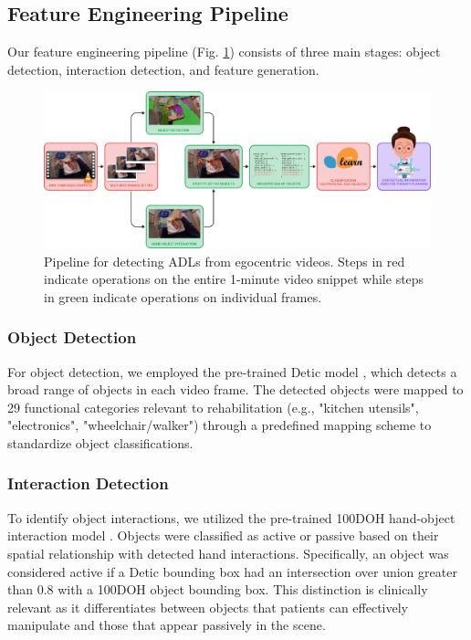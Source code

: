\documentclass[journal,twoside,web]{ieeecolor}
\begin{document}
\subsection{Feature Engineering Pipeline}

Our feature engineering pipeline (Fig. \ref{fig:pipeline}) consists of three main stages: object detection, interaction detection, and feature generation.

\begin{figure}[t!]
    \centering
    \includegraphics[width=1\linewidth]{figs/flowchart.png}
    \caption{Pipeline for detecting ADLs from egocentric videos. Steps in red indicate operations on the entire 1-minute video snippet while steps in green indicate operations on individual frames.}
    \label{fig:pipeline}
\end{figure}

\subsubsection{Object Detection}

For object detection, we employed the pre-trained Detic model \cite{Zhou2022-fl}, which detects a broad range of objects in each video frame. The detected objects were mapped to 29 functional categories relevant to rehabilitation (e.g., "kitchen utensils", "electronics", "wheelchair/walker") through a predefined mapping scheme to standardize object classifications.

\subsubsection{Interaction Detection}

To identify object interactions, we utilized the pre-trained 100DOH hand-object interaction model \cite{Shan2020-gh}. Objects were classified as active or passive based on their spatial relationship with detected hand interactions. Specifically, an object was considered active if a Detic bounding box had an intersection over union greater than 0.8 with a 100DOH object bounding box. This distinction is clinically relevant as it differentiates between objects that patients can effectively manipulate and those that appear passively in the scene.
\end{document}

